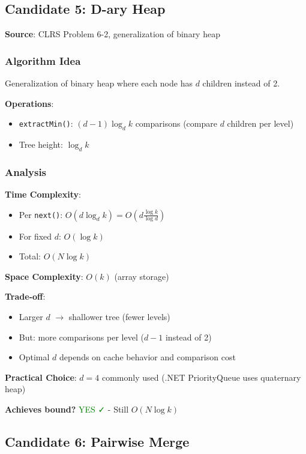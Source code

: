 \documentclass[11pt]{article}
\begin{document}
\subsection{Candidate 5: D-ary Heap}

\textbf{Source}: CLRS Problem 6-2, generalization of binary heap

\subsubsection{Algorithm Idea}

Generalization of binary heap where each node has $d$ children instead of 2.

\textbf{Operations}:
\begin{itemize}
    \item \texttt{extractMin()}: $(d-1) \log_d k$ comparisons (compare $d$ children per level)
    \item Tree height: $\log_d k$
\end{itemize}

\subsubsection{Analysis}

\textbf{Time Complexity}:
\begin{itemize}
    \item Per \texttt{next()}: $O(d \log_d k) = O(d \frac{\log k}{\log d})$
    \item For fixed $d$: $O(\log k)$
    \item Total: $O(N \log k)$
\end{itemize}

\textbf{Space Complexity}: $O(k)$ (array storage)

\textbf{Trade-off}:
\begin{itemize}
    \item Larger $d$ $\rightarrow$ shallower tree (fewer levels)
    \item But: more comparisons per level ($d-1$ instead of 2)
    \item Optimal $d$ depends on cache behavior and comparison cost
\end{itemize}

\textbf{Practical Choice}: $d=4$ commonly used (.NET PriorityQueue uses quaternary heap)

\textbf{Achieves bound?} \textcolor{green}{YES ✓} - Still $O(N \log k)$

\subsection{Candidate 6: Pairwise Merge}
\end{document}
